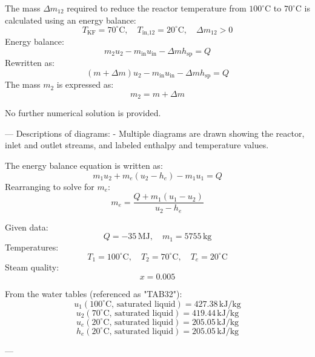 The mass \( \Delta m_{12} \) required to reduce the reactor temperature from \( 100^\circ\text{C} \) to \( 70^\circ\text{C} \) is calculated using an energy balance:  
\[
T_{\text{KF}} = 70^\circ\text{C}, \quad T_{\text{in,12}} = 20^\circ\text{C}, \quad \Delta m_{12} > 0
\]  
Energy balance:  
\[
m_2 u_2 - m_{\text{in}} u_{\text{in}} - \Delta m h_{\text{sp}} = Q
\]  
Rewritten as:  
\[
(m + \Delta m) u_2 - m_{\text{in}} u_{\text{in}} - \Delta m h_{\text{sp}} = Q
\]  
The mass \( m_2 \) is expressed as:  
\[
m_2 = m + \Delta m
\]  

No further numerical solution is provided.  

---  
Descriptions of diagrams:  
- Multiple diagrams are drawn showing the reactor, inlet and outlet streams, and labeled enthalpy and temperature values.

The energy balance equation is written as:  
\[
m_1 u_2 + m_e (u_2 - h_e) - m_1 u_1 = Q
\]  
Rearranging to solve for \( m_e \):  
\[
m_e = \frac{Q + m_1 (u_1 - u_2)}{u_2 - h_e}
\]  

Given data:  
\[
Q = -35 \, \text{MJ}, \quad m_1 = 5755 \, \text{kg}
\]  
Temperatures:  
\[
T_1 = 100^\circ\text{C}, \quad T_2 = 70^\circ\text{C}, \quad T_e = 20^\circ\text{C}
\]  
Steam quality:  
\[
x = 0.005
\]  

From the water tables (referenced as "TAB32"):  
\[
u_1 (100^\circ\text{C}, \, \text{saturated liquid}) = 427.38 \, \text{kJ/kg}
\]  
\[
u_2 (70^\circ\text{C}, \, \text{saturated liquid}) = 419.44 \, \text{kJ/kg}
\]  
\[
u_e (20^\circ\text{C}, \, \text{saturated liquid}) = 205.05 \, \text{kJ/kg}
\]  
\[
h_e (20^\circ\text{C}, \, \text{saturated liquid}) = 205.05 \, \text{kJ/kg}
\]  

---